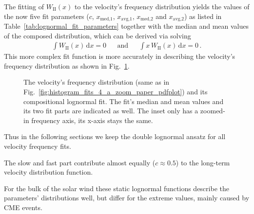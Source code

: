 The fitting of $W_\text{II}(x)$ to the velocity's frequency distribution yields the values of the now five fit parameters ($c$, $x_\text{med,1}$, $x_\text{avg,1}$, $x_\text{med,2}$ and $x_\text{avg,2}$) as listed in Table~\ref{tab:lognormal_fit_parameters} together with the median and mean values of the composed distribution, which can be derived via solving
\begin{align}
	\int W_\text{II}(x)\,\text{d}x = 0	&	&\text{and}	&	&\int x\,W_\text{II}(x)\,\text{d}x = 0	\,.
\end{align}
This more complex fit function is more accurately in describing the velocity's frequency distribution as shown in Fig.~\ref{fig:histogram_fits_V_a_zoom_dbl_paper_pdfplot}.
\begin{figure}
	\caption{The velocity's frequency distribution (same as in Fig.~\ref{fig:histogram_fits_4_a_zoom_paper_pdfplot}) and its compositional lognormal fit. The fit's median and mean values and its two fit parts are indicated as well. The inset only has a zoomed-in frequency axis, its x-axis stays the same.}
	\label{fig:histogram_fits_V_a_zoom_dbl_paper_pdfplot}
\end{figure}
Thus in the following sections we keep the double lognormal ansatz for all velocity frequency fits.

The slow and fast part contribute almost equally ($c \approx 0.5$) to the long-term velocity distribution function.

For the bulk of the solar wind these static lognormal functions describe the parameters' distributions well, but differ for the extreme values, mainly caused by CME events.

